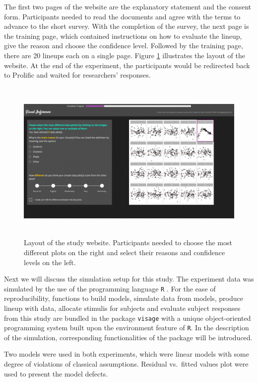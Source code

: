 \documentclass{monashthesis}
\theoremstyle{definition}
\theoremstyle{definition}
\theoremstyle{definition}
\theoremstyle{definition}
\theoremstyle{remark}
\begin{document}
The first two pages of the website are the explanatory statement and the consent form. Participants needed to read the documents and agree with the terms to advance to the short survey. With the completion of the survey, the next page is the training page, which contained instructions on how to evaluate the lineup, give the reason and choose the confidence level. Followed by the training page, there are 20 lineups each on a single page. Figure \ref{fig:WebsiteLayout} illustrates the layout of the website. At the end of the experiment, the participants would be redirected back to Prolific and waited for researchers' responses.

\begin{figure}
\centering
\includegraphics[width=5.72917in,height=3.11458in]{figures/website.png}
\caption{Layout of the study website. Participants needed to choose the most different plots on the right and select their reasons and confidence levels on the left. \label{fig:WebsiteLayout}}
\end{figure}

Next we will discuss the simulation setup for this study. The experiment data was simulated by the use of the programming language \texttt{R} \autocite{r_core_team_r_2021}. For the ease of reproducibility, functions to build models, simulate data from models, produce lineup with data, allocate stimulis for subjects and evaluate subject responses from this study are bundled in the package \texttt{visage} with a unique object-oriented programming system built upon the environment feature of \texttt{R}. In the description of the simulation, corresponding functionalities of the package will be introduced.

Two models were used in both experiments, which were linear models with some degree of violations of classical assumptions. Residual vs.~fitted values plot were used to present the model defects.
\end{document}
